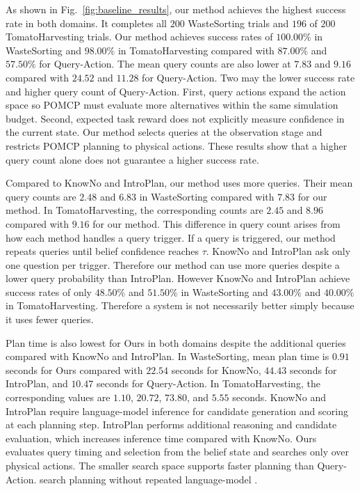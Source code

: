 As shown in Fig.~\ref{fig:baseline_results}, our method achieves the highest success rate in both domains. It completes all $200$ WasteSorting trials and $196$ of $200$ TomatoHarvesting trials. Our method achieves success rates of $100.00\%$ in WasteSorting and $98.00\%$ in TomatoHarvesting compared with $87.00\%$ and $57.50\%$ for Query-Action. The mean query counts are also lower at $7.83$ and $9.16$ compared with $24.52$ and $11.28$ for Query-Action. Two  may  the lower success rate and higher query count of Query-Action. First, query actions expand the action space so POMCP must evaluate more alternatives within the same simulation budget. Second, expected task reward does not explicitly measure confidence in the current state. Our method selects queries at the observation stage and restricts POMCP planning to physical actions. These results show that a higher query count alone does not guarantee a higher success rate. 

Compared to KnowNo and IntroPlan, our method uses more queries. Their mean query counts are $2.48$ and $6.83$ in WasteSorting compared with $7.83$ for our method. In TomatoHarvesting, the corresponding counts are $2.45$ and $8.96$ compared with $9.16$ for our method. This difference in query count arises from how each method handles a query trigger. If a query is triggered, our method repeats queries until belief confidence reaches $\tau$. KnowNo and IntroPlan ask only one question per trigger. Therefore our method can use more queries despite a lower query probability than IntroPlan. However KnowNo and IntroPlan achieve success rates of only $48.50\%$ and $51.50\%$ in WasteSorting and $43.00\%$ and $40.00\%$ in TomatoHarvesting. Therefore a system is not necessarily better simply because it uses fewer queries.

Plan time is also lowest for Ours in both domains despite the additional queries compared with KnowNo and IntroPlan. In WasteSorting, mean plan time is $0.91$ seconds for Ours compared with $22.54$ seconds for KnowNo, $44.43$ seconds for IntroPlan, and $10.47$ seconds for Query-Action. In TomatoHarvesting, the corresponding values are $1.10$, $20.72$, $73.80$, and $5.55$ seconds. KnowNo and IntroPlan require language-model inference for candidate generation and scoring at each planning step. IntroPlan performs additional reasoning and candidate evaluation, which increases inference time compared with KnowNo. Ours evaluates query timing and selection from the belief state and searches only over physical actions. The smaller search space supports faster planning than Query-Action.  search  planning  without repeated language-model . %

